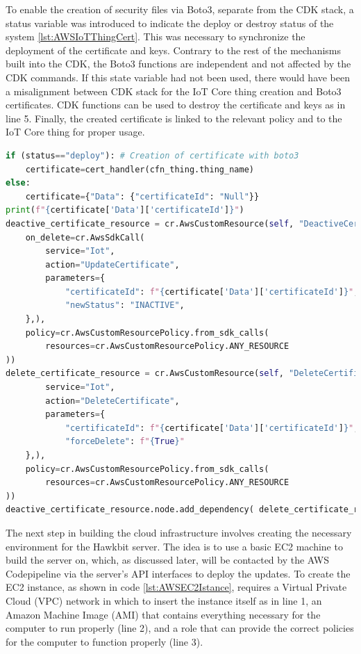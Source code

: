 To enable the creation of security files via Boto3, separate from the CDK stack, a status variable was introduced to indicate the deploy or destroy status of the system \ref{lst:AWSIoTThingCert}. This was necessary to synchronize the deployment of the certificate and keys. Contrary to the rest of the mechanisms built into the CDK, the Boto3 functions are independent and not affected by the CDK commands. If this state variable had not been used, there would have been a misalignment between CDK stack for the IoT Core thing creation and Boto3 certificates. CDK functions can be used to destroy the certificate and keys as in line 5. Finally, the created certificate is linked to the relevant policy and to the IoT Core thing for proper usage.
\begin{lstlisting}[language=Python, caption={Code for the creation and destruction of IoT Core Thing certificates and keys from the CDK stack}, label=lst:AWSIoTThingCert]
if (status=="deploy"): # Creation of certificate with boto3
    certificate=cert_handler(cfn_thing.thing_name)
else:
    certificate={"Data": {"certificateId": "Null"}}
print(f"{certificate['Data']['certificateId']}")
deactive_certificate_resource = cr.AwsCustomResource(self, "DeactiveCertificateResource",
    on_delete=cr.AwsSdkCall(
        service="Iot",
        action="UpdateCertificate",
        parameters={
            "certificateId": f"{certificate['Data']['certificateId']}",
            "newStatus": "INACTIVE",
    },),
    policy=cr.AwsCustomResourcePolicy.from_sdk_calls(
        resources=cr.AwsCustomResourcePolicy.ANY_RESOURCE
))
delete_certificate_resource = cr.AwsCustomResource(self, "DeleteCertificateResource", # Destruction of certificates
        service="Iot",
        action="DeleteCertificate",
        parameters={
            "certificateId": f"{certificate['Data']['certificateId']}",
            "forceDelete": f"{True}"
    },),
    policy=cr.AwsCustomResourcePolicy.from_sdk_calls(
        resources=cr.AwsCustomResourcePolicy.ANY_RESOURCE
))
deactive_certificate_resource.node.add_dependency( delete_certificate_resource )
\end{lstlisting}

The next step in building the cloud infrastructure involves creating the necessary environment for the Hawkbit server. The idea is to use a basic EC2 machine to build the server on, which, as discussed later, will be contacted by the AWS Codepipeline via the server's API interfaces to deploy the updates. To create the EC2 instance, as shown in code \ref{lst:AWSEC2Istance}, requires a Virtual Private Cloud (VPC) network in which to insert the instance itself as in line 1, an Amazon Machine Image (AMI) that contains everything necessary for the computer to run properly (line 2), and a role that can provide the correct policies for the computer to function properly (line 3).

